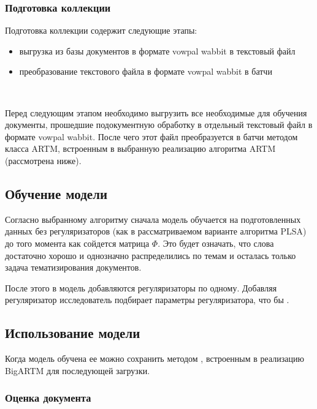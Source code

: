 \subsubsection{Подготовка коллекции}

Подготовка коллекции содержит следующие этапы:

\begin{itemize}
    \item выгрузка из базы документов в формате vowpal wabbit в текстовый файл
    \item преобразование текстового файла в формате vowpal wabbit в батчи
\end{itemize}
~\

Перед следующим этапом необходимо выгрузить все необходимые для обучения документы, прошедшие подокументную обработку в отдельный текстовый файл в формате vowpal wabbit. После чего этот файл преобразуется в батчи методом класса ARTM, встроенным в выбранную реализацию алгоритма ARTM (рассмотрена ниже).

\subsection{Обучение модели}

Согласно выбранному алгоритму сначала модель обучается на подготовленных данных без регуляризаторов (как в рассматриваемом варианте алгоритма PLSA) до того момента как сойдется матрица $\Phi$. Это будет означать, что слова достаточно хорошо и однозначно распределились по темам и осталась только задача тематизирования документов.

После этого в модель добавляются регуляризаторы по одному. Добавляя регуляризатор исследователь подбирает параметры регуляризатора, что бы \todo{}.

\subsection{Использование модели}

Когда модель обучена ее можно сохранить методом \todo{}, встроенным в реализацию BigARTM для последующей загрузки.

\subsubsection{Оценка документа}

